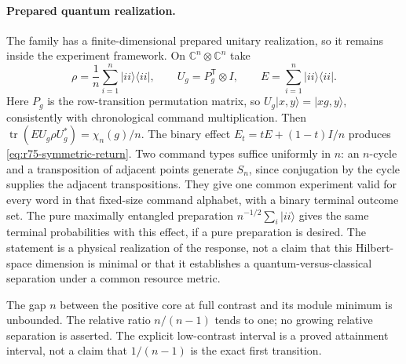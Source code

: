\paragraph{Prepared quantum realization.}
The family has a finite-dimensional prepared unitary realization,
so it remains inside the experiment framework. On
$\mathbb C^n\otimes\mathbb C^n$ take
\[
 \rho=\frac1n\sum_{i=1}^n|ii\rangle\langle ii|,
 \qquad U_g=P_g^{\mathsf T}\otimes I,
 \qquad E=\sum_{i=1}^n|ii\rangle\langle ii|.
\]
Here $P_g$ is the row-transition permutation matrix, so
$U_g|x,y\rangle=|xg,y\rangle$, consistently with chronological
command multiplication. Then $\operatorname{tr}(E U_g\rho U_g^*)=\chi_n(g)/n$.
The binary effect $E_t=tE+(1-t)I/n$ produces
\eqref{eq:r75-symmetric-return}. Two command types suffice uniformly in
$n$: an $n$-cycle and a transposition of adjacent points generate $S_n$,
since conjugation by the cycle supplies the adjacent transpositions.
They give one common experiment valid for every word in that fixed-size
command alphabet, with a binary terminal outcome set.
The pure maximally entangled preparation
$n^{-1/2}\sum_i|ii\rangle$ gives the same terminal probabilities
with this effect, if a pure preparation is desired. The statement
is a physical realization of the response, not a claim that this
Hilbert-space dimension is minimal or that it establishes a
quantum-versus-classical separation under a common resource metric.

The gap $n$ between the positive core at full contrast and its
module minimum is unbounded. The relative ratio $n/(n-1)$ tends
to one; no growing relative separation is asserted. The explicit
low-contrast interval is a proved attainment interval, not a claim
that $1/(n-1)$ is the exact first transition.
